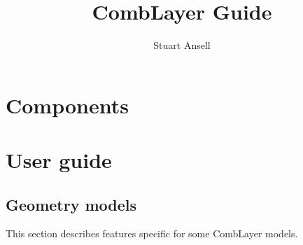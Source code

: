 \documentclass{article}
\title{CombLayer Guide}
\author{Stuart Ansell}
\begin{document}
\maketitle
\tableofcontents


\newpage







\section{Components}




\section{User guide}




\subsection{Geometry models}
This section describes features specific for some CombLayer models.

\end{document}
